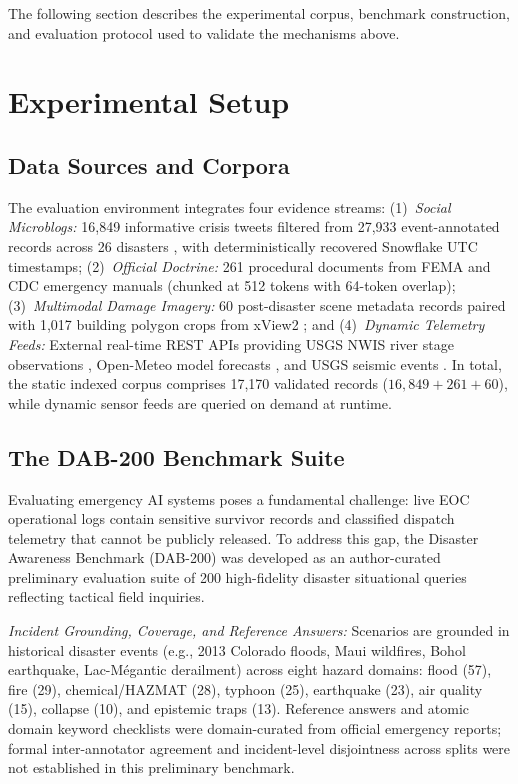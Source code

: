 \documentclass[conference]{IEEEtran}
\begin{document}
The following section describes the experimental corpus, benchmark construction, and evaluation protocol used to validate the mechanisms above.

\section{Experimental Setup}

\subsection{Data Sources and Corpora}
The evaluation environment integrates four evidence streams: (1)~\textit{Social Microblogs:} 16,849 informative crisis tweets filtered from 27,933 event-annotated records across 26 disasters \cite{olteanu2015}, with deterministically recovered Snowflake UTC timestamps; (2)~\textit{Official Doctrine:} 261 procedural documents from FEMA and CDC emergency manuals (chunked at 512 tokens with 64-token overlap); (3)~\textit{Multimodal Damage Imagery:} 60 post-disaster scene metadata records paired with 1,017 building polygon crops from xView2 \cite{xview2}; and (4)~\textit{Dynamic Telemetry Feeds:} External real-time REST APIs providing USGS NWIS river stage observations \cite{usgsnwis}, Open-Meteo model forecasts \cite{openmeteo}, and USGS seismic events \cite{usgsfdsn}. In total, the static indexed corpus comprises 17,170 validated records ($16{,}849 + 261 + 60$), while dynamic sensor feeds are queried on demand at runtime.

\subsection{The DAB-200 Benchmark Suite}
Evaluating emergency AI systems poses a fundamental challenge: live EOC operational logs contain sensitive survivor records and classified dispatch telemetry that cannot be publicly released. To address this gap, the Disaster Awareness Benchmark (DAB-200) \cite{dab200} was developed as an author-curated preliminary evaluation suite of 200 high-fidelity disaster situational queries reflecting tactical field inquiries.

\textit{Incident Grounding, Coverage, and Reference Answers:} Scenarios are grounded in historical disaster events (e.g., 2013 Colorado floods, Maui wildfires, Bohol earthquake, Lac-M\'{e}gantic derailment) \cite{olteanu2015} across eight hazard domains: flood (57), fire (29), chemical/HAZMAT (28), typhoon (25), earthquake (23), air quality (15), collapse (10), and epistemic traps (13). Reference answers and atomic domain keyword checklists were domain-curated from official emergency reports; formal inter-annotator agreement and incident-level disjointness across splits were not established in this preliminary benchmark.
\end{document}
